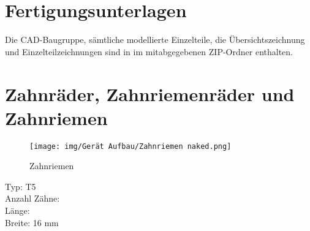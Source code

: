 \section{Fertigungsunterlagen}

Die CAD-Baugruppe, sämtliche modellierte Einzelteile, die Übersichtszeichnung und Einzelteilzeichnungen sind in im mitabgegebenen ZIP-Ordner enthalten.

\section{Zahnräder, Zahnriemenräder und Zahnriemen}













\begin{figure}[H]
  \texttt{[image: img/Gerät Aufbau/Zahnriemen naked.png]}
  \centering
  \caption{Zahnriemen}
  \label{fig:Zahnriemen}
\end{figure}

Typ: T5\\

Anzahl Zähne:\\

Länge: \\

Breite: 16 mm
